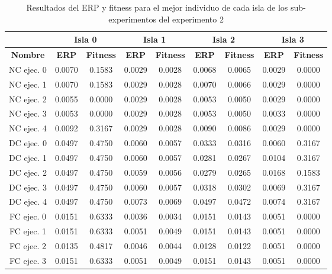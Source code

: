 \begin{table}[hbtp!]
\caption{Resultados del ERP y fitness para el mejor individuo de cada isla de los sub-experimentos del experimento 2}\label{tab:mejores_islas_pm01}
\small
\centering
\begin{center}
\begin{tabular}{c|cc|cc|cc|cc}
{\textbf{}} & \multicolumn{2}{c|}{{\textbf{Isla 0}}} & \multicolumn{2}{c|}{{\textbf{Isla 1}}} & \multicolumn{2}{c|}{{\textbf{Isla 2}}} & \multicolumn{2}{c}{{\textbf{Isla 3}}}\\ \hline
{\textbf{Nombre}} & {\textbf{ERP}} & {\textbf{Fitness}} & {\textbf{ERP}} & {\textbf{Fitness}} & {\textbf{ERP}} & {\textbf{Fitness}} & {\textbf{ERP}} & {\textbf{Fitness}} \\ \hline
NC ejec. 0 & 0.0070 & 0.1583 & 0.0029 & 0.0028 & 0.0068 & 0.0065 & 0.0029 & 0.0000 \\
NC ejec. 1 & 0.0070 & 0.1583 & 0.0029 & 0.0028 & 0.0070 & 0.0066 & 0.0029 & 0.0000 \\
NC ejec. 2 & 0.0055 & 0.0000 & 0.0029 & 0.0028 & 0.0053 & 0.0050 & 0.0029 & 0.0000 \\
NC ejec. 3 & 0.0053 & 0.0000 & 0.0029 & 0.0028 & 0.0053 & 0.0050 & 0.0033 & 0.0000 \\
NC ejec. 4 & 0.0092 & 0.3167 & 0.0029 & 0.0028 & 0.0090 & 0.0086 & 0.0029 & 0.0000 \\ \hline
DC ejec. 0 & 0.0497 & 0.4750 & 0.0060 & 0.0057 & 0.0333 & 0.0316 & 0.0060 & 0.3167 \\
DC ejec. 1 & 0.0497 & 0.4750 & 0.0060 & 0.0057 & 0.0281 & 0.0267 & 0.0104 & 0.3167 \\
DC ejec. 2 & 0.0497 & 0.4750 & 0.0059 & 0.0056 & 0.0279 & 0.0265 & 0.0168 & 0.1583 \\
DC ejec. 3 & 0.0497 & 0.4750 & 0.0060 & 0.0057 & 0.0318 & 0.0302 & 0.0069 & 0.3167 \\
DC ejec. 4 & 0.0497 & 0.4750 & 0.0073 & 0.0069 & 0.0497 & 0.0472 & 0.0074 & 0.3167 \\ \hline
FC ejec. 0 & 0.0151 & 0.6333 & 0.0036 & 0.0034 & 0.0151 & 0.0143 & 0.0051 & 0.0000 \\
FC ejec. 1 & 0.0151 & 0.6333 & 0.0051 & 0.0049 & 0.0151 & 0.0143 & 0.0051 & 0.0000 \\
FC ejec. 2 & 0.0135 & 0.4817 & 0.0046 & 0.0044 & 0.0128 & 0.0122 & 0.0051 & 0.0000 \\
FC ejec. 3 & 0.0151 & 0.6333 & 0.0051 & 0.0049 & 0.0151 & 0.0143 & 0.0051 & 0.0000 \\

\end{tabular}
\end{center}
\end{table}
